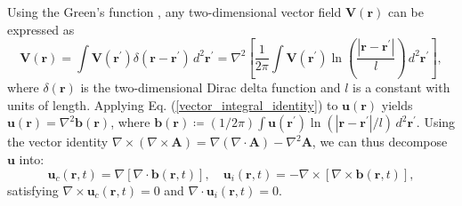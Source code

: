\documentclass[aps,prl,twocolumn,showpacs,notitlepage,floatfix,superscriptaddress]{revtex4-1}
\begin{document}
Using the Green's function \cite{Watanabe2013}, any 
two-dimensional vector field $\boldsymbol{V} \left( \boldsymbol{r}\right)$ can be expressed as 
\begin{equation}\label{vector_integral_identity}
\boldsymbol{V} \left( \boldsymbol{r}\right) 
= 
\int 
\boldsymbol{V} \left( \boldsymbol{r}^{\prime}\right) 
\delta \left( \boldsymbol{r} - \boldsymbol{r}^{\prime} \right) 
\, d^2 \boldsymbol{r}^{\prime} 
= 
\nabla^2 
\left\lbrack 
\frac{1}{2 \pi} 
\int 
\boldsymbol{V} \left( \boldsymbol{r}^{\prime}\right) 
\ln \left( \frac{\left\vert \boldsymbol{r} - \boldsymbol{r}^{\prime} \right\vert}{l} \right) 
\, 
d^2 \boldsymbol{r}^{\prime} 
\right\rbrack 
, 
\end{equation}
where $\delta \left( \boldsymbol{r} \right)$ is the two-dimensional Dirac delta function 
and $l$ is a constant with units of length. 
Applying Eq. (\ref{vector_integral_identity}) to $\boldsymbol{u}(\boldsymbol{r})$ yields $\boldsymbol{u}(\boldsymbol{r})=\nabla^{2}\boldsymbol{b}(\boldsymbol{r})$, where $
\boldsymbol{b} \left( \boldsymbol{r}\right) 
\coloneqq 
\left( 1 / 2 \pi \right) 
\int 
\boldsymbol{u} \left( \boldsymbol{r}^{\prime} \right) 
\ln \left( \left\vert \boldsymbol{r} - \boldsymbol{r}^{\prime} \right\vert / l \right) 
\, d^2 \boldsymbol{r}^{\prime} 
$.
Using the vector identity $\nabla \times \left( \nabla \times \boldsymbol{A} \right) = \nabla \left( \nabla \cdot \boldsymbol{A} \right) - \nabla^2 \boldsymbol{A}$, we can thus decompose $\boldsymbol{u}$ into:
\begin{equation}
\boldsymbol{u}_{c} \left( \boldsymbol{r}, t \right) 
= 
\nabla 
\left\lbrack 
\nabla 
\cdot 
\boldsymbol{b} \left( \boldsymbol{r}, t \right) 
\right\rbrack 
, \quad 
\boldsymbol{u}_{i} \left( \boldsymbol{r}, t \right) 
= 
- 
\nabla 
\times 
\left\lbrack 
\nabla 
\times 
\boldsymbol{b} \left( \boldsymbol{r}, t \right) 
\right\rbrack,
\label{Eq:app:B:vc_vic_as_b}
\end{equation}
satisfying 
$\nabla \times \boldsymbol{u}_{c} \left( \boldsymbol{r}, t \right) = 0$ and 
$\nabla \cdot \boldsymbol{u}_{i} \left( \boldsymbol{r}, t \right) = 0$.
\end{document}
